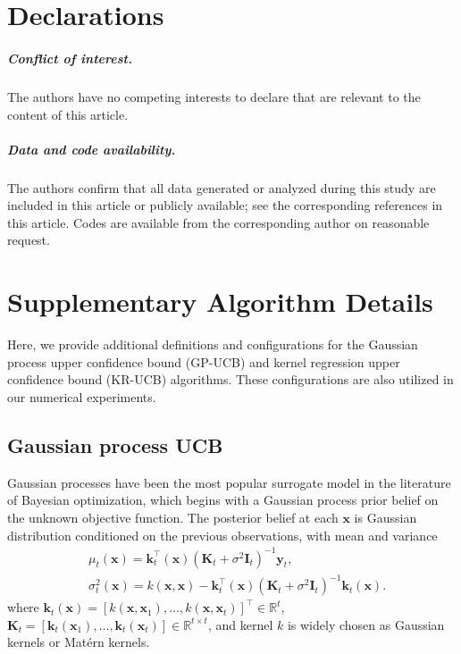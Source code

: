 \documentclass[11pt,en]{elegantpaper}
\newcommand{\x}{\bm{x}}
\newcommand{\y}{\bm{y}}
\newcommand{\K}{\bm{K}}
\renewcommand{\k}{\bm{k}}
\newcommand{\1}{\mathds{1}}
\begin{document}
\section*{Declarations}

\subparagraph{Conflict of interest.} 
The authors have no competing interests to declare that are relevant to the content of this article.

\subparagraph{Data and code availability.} 
The authors confirm that all data generated or analyzed during this study are included in this article or publicly available; see the corresponding references in this article. Codes are available from the corresponding author on reasonable request.  




\appendix
{}
\renewcommand{\theequation}{\thesection\arabic{equation}}


\section{Supplementary Algorithm Details}
\label{sec:supplementary algorithm details}

Here, we provide additional definitions and configurations for the Gaussian process upper confidence bound (GP-UCB) and kernel regression upper confidence bound (KR-UCB) algorithms.
These configurations are also utilized in our numerical experiments.




\subsection{Gaussian process UCB}
\label{sec:GP-UCB}

Gaussian processes have been the most popular surrogate model in the literature of Bayesian optimization, which begins with a Gaussian process prior belief on the unknown objective function.
The posterior belief at each $\x$ is Gaussian distribution conditioned on the previous observations, with mean and variance
\begin{align}
    & \mu_t(\x) = \k_t^{\top}(\x) (\K_t + \sigma^2 \bm{I}_t)^{-1} \y_t,
    \label{eqn:GPR}
    \\
    & \sigma_t^2(\x) = k(\x, \x) - \k_t^{\top}(\x) (\K_t + \sigma^2 \bm{I}_t)^{-1} \k_t(\x).
    \label{eqn:GP Var}
\end{align}
where $\k_t(\x) = [k(\x, \x_1), \dots, k(\x, \x_t)]^{\top} \in \mathbb{R}^t$, $\K_t = [\k_t(\x_1), \dots, \k_t(\x_t)] \in \mathbb{R}^{t \times t}$, and kernel $k$ is widely chosen as Gaussian kernels or Mat\'ern kernels.
\end{document}
